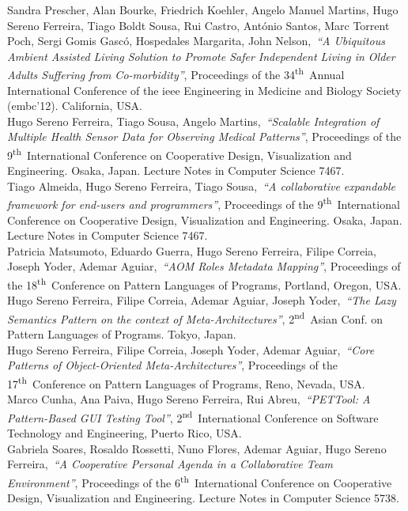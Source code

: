 \documentclass[9pt, a4paper, pstricks]{article}
\newcommand{\years}[1]{\marginnote{\small #1}}
\newcommand{\nth}{\textsuperscript{th}~}
\newcommand{\nd}{\textsuperscript{nd}~}
\newcommand{\publication}[4]{\years{#1}#2,~\emph{``#3''}, #4}
\begin{document}
\publication{2012}{Sandra Prescher, Alan Bourke, Friedrich Koehler, Angelo Manuel Martins, Hugo Sereno Ferreira, Tiago Boldt Sousa, Rui Castro, António Santos, Marc Torrent Poch, Sergi Gomis Gascó, Hospedales Margarita, John Nelson}{A Ubiquitous Ambient Assisted Living Solution to Promote Safer Independent Living in Older Adults Suffering from Co-morbidity}{Proceedings of the 34\nth Annual International Conference of the {\sc ieee} Engineering in Medicine and Biology Society ({\sc embc}'12). California, USA.}\\
\publication{2012}{Hugo Sereno Ferreira, Tiago Sousa, Angelo Martins}{Scalable Integration of Multiple Health Sensor Data for Observing Medical Patterns}{Proceedings of the 9\nth International Conference on Cooperative Design, Visualization and Engineering. Osaka, Japan. Lecture Notes in Computer Science 7467.}\\
\publication{2012}{Tiago Almeida, Hugo Sereno Ferreira, Tiago Sousa}{A collaborative expandable framework for end-users and programmers}{Proceedings of the 9\nth International Conference on Cooperative Design, Visualization and Engineering. Osaka, Japan. Lecture Notes in Computer Science 7467.}\\
\publication{2011}{Patricia Matsumoto, Eduardo Guerra, Hugo Sereno Ferreira, Filipe Correia, Joseph Yoder, Ademar Aguiar}{AOM Roles Metadata Mapping}{Proceedings of the 18\nth Conference on Pattern Languages of Programs, Portland, Oregon, USA.}\\
\publication{2011}{Hugo Sereno Ferreira, Filipe Correia, Ademar Aguiar, Joseph Yoder}{The Lazy Semantics Pattern on the context of Meta-Architectures}{2\nd Asian Conf. on Pattern Languages of Programs. Tokyo, Japan.}\\
\publication{2010}{Hugo Sereno Ferreira, Filipe Correia, Joseph Yoder, Ademar Aguiar}{Core Patterns of Object-Oriented Meta-Architectures}{Proceedings of the 17\nth Conference on Pattern Languages of Programs, Reno, Nevada, USA.}\\
\publication{2010}{Marco Cunha, Ana Paiva, Hugo Sereno Ferreira, Rui Abreu}{PETTool: A Pattern-Based GUI Testing Tool}{2\nd International Conference on Software Technology and Engineering, Puerto Rico, USA.}\\
\publication{2009}{Gabriela Soares, Rosaldo Rossetti, Nuno Flores, Ademar Aguiar, Hugo Sereno Ferreira}{A Cooperative Personal Agenda in a Collaborative Team Environment}{Proceedings of the 6\nth International Conference on Cooperative Design, Visualization and Engineering. Lecture Notes in Computer Science 5738.}\\
\end{document}
